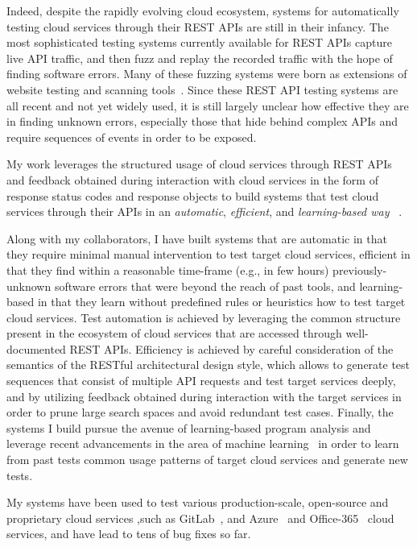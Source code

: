 \documentclass[letterpaper,single,8pt]{article}
\def\gitlab{GitLab\xspace}
\begin{document}
Indeed, despite the rapidly evolving cloud ecosystem, systems for automatically
testing cloud services through their REST APIs are still in their
infancy. The most sophisticated testing systems currently available for REST APIs
capture live API traffic, and then fuzz and replay the recorded traffic with
the hope of finding software errors. Many of these fuzzing systems were born as
extensions of website testing and scanning
tools~\cite{appspider,qualysWAS,apifuzzer}.
Since these REST API testing systems are all recent and not yet widely used, it is
still largely unclear how effective they are in finding unknown errors,
especially those that hide behind complex APIs and require sequences of events
in order to be exposed.

My work leverages the structured usage of cloud services through REST APIs
and feedback obtained during interaction with cloud services
in the form of response status codes and response objects
to build systems that test cloud services through their APIs in
an {\em automatic}, {\em efficient}, and {\em learning-based way}
~\cite{restler,restler2,pythia,atlidakis}.

Along with my collaborators, I have built systems that are
automatic in that they require minimal manual intervention to test
target cloud services, efficient in that they find within a reasonable
time-frame (e.g., in few hours) previously-unknown software errors that were
beyond the reach of past tools, and learning-based in that they learn without
predefined rules or heuristics how to test target cloud services.
Test automation is achieved by leveraging the common structure present in the
ecosystem of cloud services that are accessed through well-documented REST
APIs. Efficiency is achieved by careful consideration of the semantics of the
RESTful architectural design style, which allows to generate test sequences that
consist of multiple API requests and test target services deeply, and by
utilizing feedback obtained during interaction with the target services in order
to prune large search spaces and avoid redundant test cases. Finally, the
systems I build pursue the avenue of learning-based program analysis and leverage
recent advancements in the area of machine learning~\cite{seq2seq1,seq2seq2}
in order to learn from past tests common usage patterns of target cloud services
and generate new tests.

My systems have been used to test
various production-scale, open-source and proprietary cloud services ,such as \gitlab~\cite{gitlab},
and Azure~\cite{azure} and Office-365~\cite{office365} cloud services,
and have lead to tens of bug fixes so far.

\pagebreak


\end{document}
